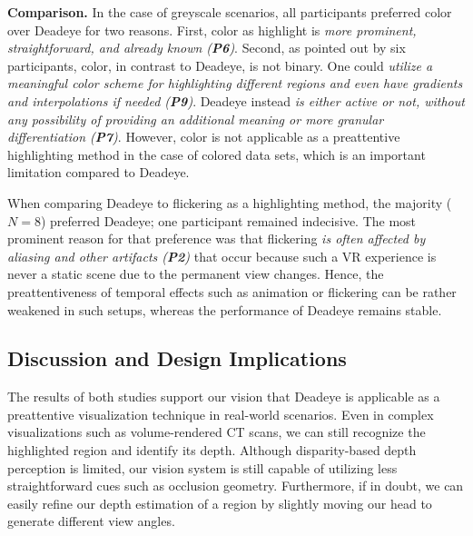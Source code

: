 \documentclass[journal]{vgtc}                %
\begin{document}
\textbf{Comparison.} In the case of greyscale scenarios, all participants preferred color over Deadeye for two reasons. First, color as highlight is \textit{more prominent, straightforward, and already known (\textbf{P6})}. Second, as pointed out by six participants, color, in contrast to Deadeye, is not binary. One could \textit{utilize a meaningful color scheme for highlighting different regions and even have gradients and interpolations if needed (\textbf{P9})}. Deadeye instead \textit{is either active or not, without any possibility of providing an additional meaning or more granular differentiation (\textbf{P7})}. However, color is not applicable as a preattentive highlighting method in the case of colored data sets, which is an important limitation compared to Deadeye.

When comparing Deadeye to flickering as a highlighting method, the majority ($N = 8$) preferred Deadeye; one participant remained indecisive. The most prominent reason for that preference was that flickering \textit{is often affected by aliasing and other artifacts (\textbf{P2})} that occur because such a VR experience is never a static scene due to the permanent view changes. Hence, the preattentiveness of temporal effects such as animation or flickering can be rather weakened in such setups, whereas the performance of Deadeye remains stable.




\subsection{Discussion and Design Implications}

The results of both studies support our vision that Deadeye is applicable as a preattentive visualization technique in real-world scenarios. Even in complex visualizations such as volume-rendered CT scans, we can still recognize the highlighted region and identify its depth. Although disparity-based depth perception is limited, our vision system is still capable of utilizing less straightforward cues such as occlusion geometry. Furthermore, if in doubt, we can easily refine our depth estimation of a region by slightly moving our head to generate different view angles.
\end{document}
